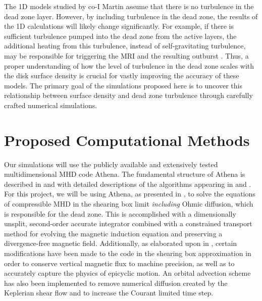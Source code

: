 \documentclass[preprint]{aastex}
\begin{document}
The 1D models studied by co-I Martin assume that there is no turbulence in the dead zone layer. However, by including turbulence in the dead zone, the results of the 1D calculations will likely change significantly.  For example, if there is sufficient turbulence pumped into the dead zone from the active layers, the additional heating from this turbulence, instead of self-gravitating turbulence, may be responsible for triggering the MRI and the resulting outburst \citep{martin14}.  Thus, a proper understanding of how the level of turbulence in the dead zone scales with the disk surface density is crucial for vastly improving the accuracy of these models. The primary goal of the simulations proposed here is to uncover this relationship between surface density and dead zone turbulence through carefully crafted numerical simulations.

\vspace{-8mm}
\section{Proposed Computational Methods}
\label{sec:code}
\vspace{-2mm}

Our simulations will use the publicly available and extensively tested multidimensional MHD code {\sc Athena}\footnotemark.
The fundamental structure of {\sc Athena} is described in \citet{gardiner05a} and \citet{gardiner08} with detailed descriptions of the algorithms appearing in \citet{stone08} and \cite{stone10}.
For this project, we will be using {\sc Athena}, as presented in \citet{stone10}, to solve the equations of compressible MHD in the shearing box limit {\it including} Ohmic diffusion, which is responsible for the dead zone. 
This is accomplished with a dimensionally unsplit, second-order accurate integrator combined with a constrained transport method for evolving the magnetic induction equation and preserving a divergence-free magnetic field. 
Additionally, as elaborated upon in \citet{stone10}, certain modifications have been made to the code in the shearing box approximation in order to conserve vertical magnetic flux to machine precision, as well as to accurately capture the physics of epicyclic motion.  An orbital advection scheme has also been implemented to remove numerical diffusion created by the Keplerian shear flow and to increase the Courant limited time step.
\end{document}

